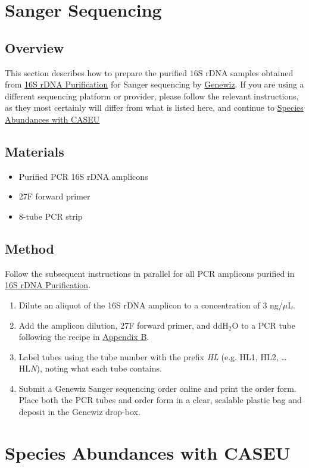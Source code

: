 \documentclass[twocolumn]{article}
\begin{document}
\section{Sanger Sequencing}\label{SS}
\subsection{Overview}
This section describes how to prepare the purified 16S rDNA samples obtained from \hyperref[1rP]{16S rDNA Purification} for Sanger sequencing by \href{https://www.genewiz.com/}{Genewiz}.
If you are using a different sequencing platform or provider,
please follow the relevant instructions,
as they most certainly will differ from what is listed here,
and continue to \hyperref[SAwC]{Species Abundances with CASEU}

\subsection{Materials}
\begin{itemize}
  \item Purified PCR 16S rDNA amplicons
  \item 27F forward primer
  \item 8-tube PCR strip
\end{itemize}
\subsection{Method}
Follow the subsequent instructions in parallel for all PCR amplicons purified in \hyperref[1rA]{16S rDNA Purification}.
\begin{enumerate}
  \item Dilute an aliquot of the 16S rDNA amplicon to a concentration of 3 ng\slash $\mu$L.
  \item Add the amplicon dilution, 27F forward primer, and ddH$_2$O to a PCR tube following the recipe in \hyperref[aB]{Appendix B}.
  \item Label tubes using the tube number with the prefix \emph{HL} (e.g. HL1, HL2, \ldots HL\textit{N}), noting what each tube contains.
  \item Submit a Genewiz Sanger sequencing order online and print the order form. Place both the PCR tubes and order form in a clear, sealable plastic bag and deposit in the Genewiz drop-box.
\end{enumerate}

\section{Species Abundances with CASEU}\label{SAwC}
\end{document}
